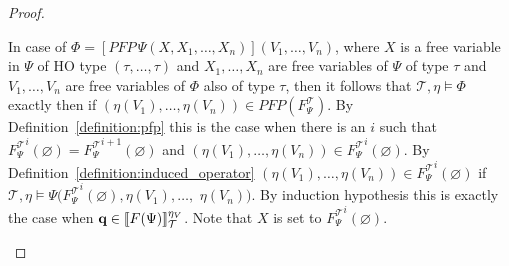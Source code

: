 \begin{proof}
\begin{compactitem}
        \item In case of $\Phi = [PFP\,\Psi(X, X_1, \dots, X_n)](V_1, \dots, V_n)$, where $X$ is a
        free variable in $\Psi$ of HO type $(\tau, \dots, \tau)$ and $X_1, \dots, X_n$ are free 
        variables of $\Psi$ of type $\tau$ and $V_1, \dots, V_n$ are free variables of $\Phi$ also of 
        type $\tau$, then it follows that $\mathcal{T}, \eta \models \Phi$ exactly then if $(\eta(V_1), 
        \dots, \eta(V_n)) \in PFP(F_\Psi^\mathcal{T})$. By Definition~\ref{definition:pfp} this is the 
        case when there is an $i$ such that ${F_\Psi^\mathcal{T}}^i(\varnothing) = {F_\Psi^		
        \mathcal{T}}^{i+1}(\varnothing)$ and $(\eta(V_1), \dots, \eta(V_n)) \in {F_\Psi^\mathcal{T}}
        ^i(\varnothing)$. By Definition~\ref{definition:induced_operator} $(\eta(V_1), \dots, 		
        \eta(V_n)) \in {F_\Psi^\mathcal{T}}^i(\varnothing)$ if $\mathcal{T}, \eta \models \Psi({F_\Psi^
        \mathcal{T}}^{i}(\varnothing), \eta(V_1), \dots, $ $\eta(V_n))$. By induction hypothesis 
        this is exactly the case when $\emph{q} \in \llbracket F(\Psi) \rrbracket_\mathcal{T}
        ^{\eta_V}$. Note that $X$ is set to ${F_\Psi^\mathcal{T}}^{i}(\varnothing)$.
		         

\end{compactitem}
\end{proof}
